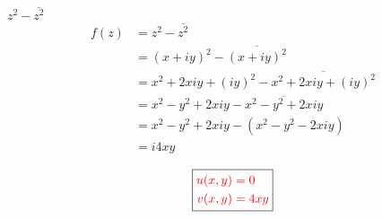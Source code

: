 \item[16.] $z^2-\overline{z^2}$
\begin{align*}
    f(z) 
    &= z^2-\overline{z^2} \\
    &= (x+iy)^2-\overline{(x+iy)^2}\\
    &= x^2+2xiy+(iy)^2-\overline{x^2+2xiy+(iy)^2}\\
    &= x^2-y^2+2xiy-\overline{x^2-y^2+2xiy}\\
    &= x^2-y^2+2xiy-(x^2-y^2-2xiy)\\
    &= i4xy\\
\end{align*}
\[
\boxed{
\textcolor{red}{
\begin{aligned}
u(x,y) &= 0 \\
v(x,y) &= 4xy
\end{aligned}
}
}
\]
